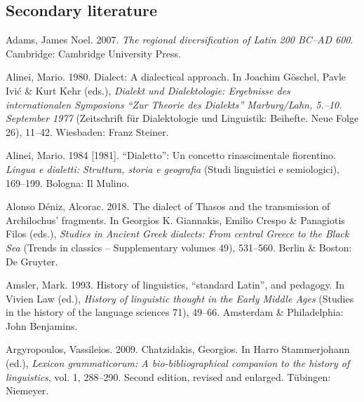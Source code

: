 \subsection[Secondary literature]{Secondary literature}
\hypertarget{Toc19704872}{}\begin{styleStandard}
Adams, James Noel. 2007. \textit{The regional diversification of Latin 200 BC–AD 600}. Cambridge: Cambridge University Press.
\end{styleStandard}

\begin{styleStandard}
Alinei, Mario. 1980. Dialect: A dialectical approach. In Joachim Göschel, Pavle Ivić \& Kurt Kehr (eds.), \textit{Dialekt und Dialektologie: Ergebnisse des internationalen Symposions “Zur Theorie des Dialekts” Marburg/Lahn, 5.–10. September 1977} (Zeitschrift für Dialektologie und Linguistik: Beihefte. Neue Folge 26), 11–42. Wiesbaden: Franz Steiner.
\end{styleStandard}

\begin{styleStandard}
Alinei, Mario. 1984 [1981]. “Dialetto”: Un concetto rinascimentale fiorentino. \textit{Lingua e dialetti: Struttura, storia e geografia} (Studi linguistici e semiologici), 169–199. Bologna: Il Mulino.
\end{styleStandard}

\begin{styleStandard}
Alonso Déniz, Alcorac. 2018. The dialect of Thasos and the transmission of Archilochus’ fragments. In Georgios K. Giannakis, Emilio Crespo \& Panagiotis Filos (eds.), \textit{Studies in Ancient Greek dialects: From central Greece to the Black Sea} (Trends in classics – Supplementary volumes 49), 531–560. Berlin \& Boston: De Gruyter.
\end{styleStandard}

\begin{styleStandard}
Amsler, Mark. 1993. History of linguistics, “standard Latin”, and pedagogy. In Vivien Law (ed.), \textit{History of linguistic thought in the Early Middle Ages} (Studies in the history of the language sciences 71), 49–66. Amsterdam \& Philadelphia: John Benjamins.
\end{styleStandard}

\begin{styleStandard}
Argyropoulos, Vassileios. 2009. Chatzidakis, Georgios. In Harro Stammerjohann (ed.), \textit{Lexicon grammaticorum: A bio-bibliographical companion to the history of linguistics}, vol. 1, 288–290. Second edition, revised and enlarged. Tübingen: Niemeyer.
\end{styleStandard}

